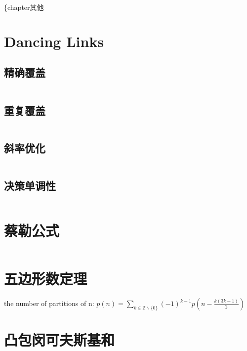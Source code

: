 \{chapter{其他}
\section{Dancing Links}
\subsection{精确覆盖}
\inputminted{cpp}{\source/others/exact.cpp}
\subsection{重复覆盖}
\inputminted{cpp}{\source/others/rader.cpp}
\subsection{斜率优化}
\inputminted{cpp}{\source/others/optimize.cpp}
\subsection{决策单调性}
\inputminted{cpp}{\source/others/dicision.cpp}
\section{蔡勒公式}
\inputminted{cpp}{\source/others/zellers-congruence.cpp}
\section{五边形数定理}
the number of partitions of n:
$p(n) = \sum_{k \in \mathbb{Z} \backslash \{0\}} (-1)^{k - 1}p(n - \frac{k(3k-1)}{2})$
\section{凸包闵可夫斯基和}
\inputminted{cpp}{\source/others/mink.cpp}

